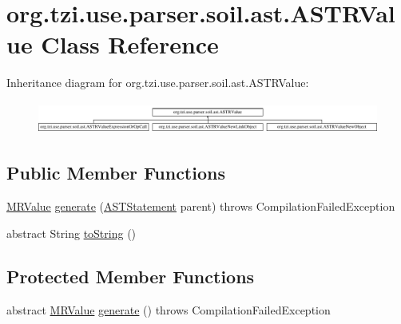 \hypertarget{classorg_1_1tzi_1_1use_1_1parser_1_1soil_1_1ast_1_1_a_s_t_r_value}{\section{org.\-tzi.\-use.\-parser.\-soil.\-ast.\-A\-S\-T\-R\-Value Class Reference}
\label{classorg_1_1tzi_1_1use_1_1parser_1_1soil_1_1ast_1_1_a_s_t_r_value}
}
Inheritance diagram for org.\-tzi.\-use.\-parser.\-soil.\-ast.\-A\-S\-T\-R\-Value\-:\begin{figure}[H]
\begin{center}
\leavevmode
\includegraphics[height=1.072797cm]{classorg_1_1tzi_1_1use_1_1parser_1_1soil_1_1ast_1_1_a_s_t_r_value}
\end{center}
\end{figure}
\subsection*{Public Member Functions}
\begin{DoxyCompactItemize}
\item 
\hyperlink{classorg_1_1tzi_1_1use_1_1uml_1_1sys_1_1soil_1_1_m_r_value}{M\-R\-Value} \hyperlink{classorg_1_1tzi_1_1use_1_1parser_1_1soil_1_1ast_1_1_a_s_t_r_value_a8e0adf509a4e08e16191cfe1bf1755fb}{generate} (\hyperlink{classorg_1_1tzi_1_1use_1_1parser_1_1soil_1_1ast_1_1_a_s_t_statement}{A\-S\-T\-Statement} parent)  throws Compilation\-Failed\-Exception 
\item 
abstract String \hyperlink{classorg_1_1tzi_1_1use_1_1parser_1_1soil_1_1ast_1_1_a_s_t_r_value_abfd6405d18d4eeb41d1c16ee9edd98ea}{to\-String} ()
\end{DoxyCompactItemize}
\subsection*{Protected Member Functions}
\begin{DoxyCompactItemize}
\item 
abstract \hyperlink{classorg_1_1tzi_1_1use_1_1uml_1_1sys_1_1soil_1_1_m_r_value}{M\-R\-Value} \hyperlink{classorg_1_1tzi_1_1use_1_1parser_1_1soil_1_1ast_1_1_a_s_t_r_value_a6c6ef83b01f8660211486c53d1f75ddc}{generate} ()  throws Compilation\-Failed\-Exception
\end{DoxyCompactItemize}
